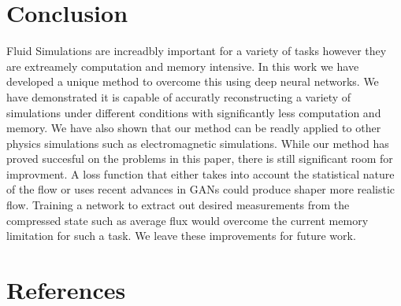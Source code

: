 \documentclass{article}
\begin{document}
\section{Conclusion}

Fluid Simulations are increadbly important for a variety of tasks however they are extreamely computation and memory intensive. In this work we have developed a unique method to overcome this using deep neural networks. We have demonstrated it is capable of accuratly reconstructing a variety of simulations under different conditions with significantly less computation and memory. We have also shown that our method can be readly applied to other physics simulations such as electromagnetic simulations. While our method has proved succesful on the problems in this paper, there is still significant room for improvment. A loss function that either takes into account the statistical nature of the flow or uses recent advances in GANs could produce shaper more realistic flow. Training a network to extract out desired measurements from the compressed state such as average flux would overcome the current memory limitation for such a task. We leave these improvements for future work.

\section*{References}



\end{document}
